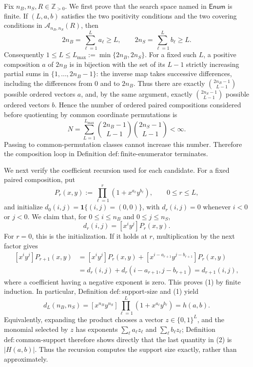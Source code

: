 Fix \(n_B,n_S,R\in\mathbb Z_{>0}\).  We first prove that the search space named in \(\mathsf{Enum}\) is finite.  If \((L,a,b)\) satisfies the two positivity conditions and the two covering conditions in \(\mathcal A_{n_B,n_S}(R)\), then
\[
  2n_B=\sum_{\ell=1}^{L}a_\ell\ge L,
  \qquad
  2n_S=\sum_{\ell=1}^{L}b_\ell\ge L.
\]
Consequently \(1\le L\le L_{\max}:=\min\{2n_B,2n_S\}\).  For a fixed such \(L\), a positive composition \(a\) of \(2n_B\) is in bijection with the set of its \(L-1\) strictly increasing partial sums in \(\{1,\ldots,2n_B-1\}\): the inverse map takes successive differences, including the differences from \(0\) and to \(2n_B\).  Thus there are exactly \(\binom{2n_B-1}{L-1}\) possible ordered vectors \(a\), and, by the same argument, exactly \(\binom{2n_S-1}{L-1}\) possible ordered vectors \(b\).  Hence the number of ordered paired compositions considered before quotienting by common coordinate permutations is
\[
  N=\sum_{L=1}^{L_{\max}}
       \binom{2n_B-1}{L-1}\binom{2n_S-1}{L-1}<\infty.
\]
Passing to common-permutation classes cannot increase this number.  Therefore the composition loop in Definition \(\mathrm{def{:}finite\text{-}enumerator}\) terminates.

We next verify the coefficient recursion used for each candidate.  For a fixed paired composition, put
\[
  P_r(x,y):=\prod_{\ell=1}^{r}(1+x^{a_\ell}y^{b_\ell}),
  \qquad 0\le r\le L,
\]
and initialize \(d_0(i,j)=\mathbf 1\{(i,j)=(0,0)\}\), with \(d_r(i,j)=0\) whenever \(i<0\) or \(j<0\).  We claim that, for \(0\le i\le n_B\) and \(0\le j\le n_S\),
\[
  d_r(i,j)=[x^iy^j]P_r(x,y).                                      \tag{1}
\]
For \(r=0\), this is the initialization.  If it holds at \(r\), multiplication by the next factor gives
\[
\begin{aligned}
 [x^iy^j]P_{r+1}(x,y)
 &= [x^iy^j]P_r(x,y)
    +[x^{i-a_{r+1}}y^{j-b_{r+1}}]P_r(x,y)\\
 &=d_r(i,j)+d_r(i-a_{r+1},j-b_{r+1})
  =d_{r+1}(i,j),
\end{aligned}
\]
where a coefficient having a negative exponent is zero.  This proves (1) by finite induction.  In particular, Definition \(\mathrm{def{:}support\text{-}size}\) and (1) yield
\[
 d_L(n_B,n_S)
 =[x^{n_B}y^{n_S}]\prod_{\ell=1}^{L}(1+x^{a_\ell}y^{b_\ell})
 =h(a,b).                                                        \tag{2}
\]
Equivalently, expanding the product chooses a vector \(z\in\{0,1\}^L\), and the monomial selected by \(z\) has exponents \(\sum_\ell a_\ell z_\ell\) and \(\sum_\ell b_\ell z_\ell\); Definition \(\mathrm{def{:}common\text{-}support}\) therefore shows directly that the last quantity in (2) is \(|H(a,b)|\).  Thus the recursion computes the support size exactly, rather than approximately.

